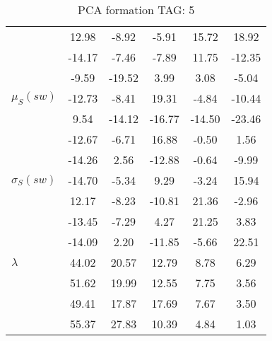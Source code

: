 \begin{table}[h!]
\begin{center}
\begin{tabular}{| l || c | c | c | c | c |}
 & 12.98  & -8.92  & -5.91  & 15.72  & 18.92 \\
 & -14.17  & -7.46  & -7.89  & 11.75  & -12.35 \\
 & -9.59  & -19.52  & 3.99  & 3.08  & -5.04 \\\hline
$\mu_S(sw)$ & -12.73  & -8.41  & 19.31  & -4.84  & -10.44 \\
 & 9.54  & -14.12  & -16.77  & -14.50  & -23.46 \\
 & -12.67  & -6.71  & 16.88  & -0.50  & 1.56 \\
 & -14.26  & 2.56  & -12.88  & -0.64  & -9.99 \\\hline
$\sigma_S(sw)$ & -14.70  & -5.34  & 9.29  & -3.24  & 15.94 \\
 & 12.17  & -8.23  & -10.81  & 21.36  & -2.96 \\
 & -13.45  & -7.29  & 4.27  & 21.25  & 3.83 \\
 & -14.09  & 2.20  & -11.85  & -5.66  & 22.51 \\\hline\hline
$\lambda$ & 44.02  & 20.57  & 12.79  & 8.78  & 6.29 \\
 & 51.62  & 19.99  & 12.55  & 7.75  & 3.56 \\
 & 49.41  & 17.87  & 17.69  & 7.67  & 3.50 \\
 & 55.37  & 27.83  & 10.39  & 4.84  & 1.03 \\\hline
\end{tabular}
\caption{PCA formation TAG: 5}
\end{center}
\end{table}